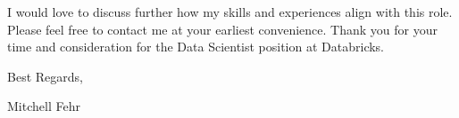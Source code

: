 \documentclass[11pt]{letter}
\begin{document}
\noindent I would love to discuss further how my skills and experiences align with this role. Please feel free to contact me at your earliest convenience. Thank you for your time and consideration for the Data Scientist position at Databricks.

\vspace{0.1in}
\vfill

\begin{flushleft}
Best Regards,

\vspace{0.9 in}

Mitchell Fehr
\end{flushleft}
\end{document}
